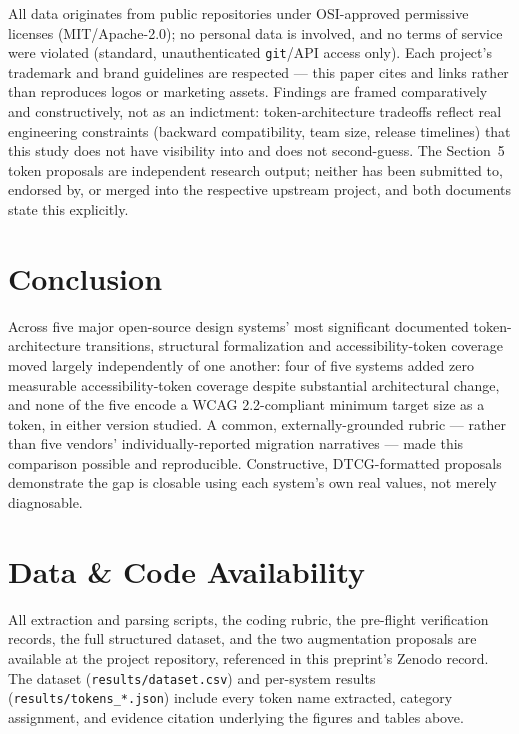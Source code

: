 \documentclass[11pt]{article}
\begin{document}
All data originates from public repositories under OSI-approved permissive licenses (MIT/Apache-2.0); no personal data is involved, and no terms of service were violated (standard, unauthenticated \texttt{git}/API access only). Each project's trademark and brand guidelines are respected --- this paper cites and links rather than reproduces logos or marketing assets. Findings are framed comparatively and constructively, not as an indictment: token-architecture tradeoffs reflect real engineering constraints (backward compatibility, team size, release timelines) that this study does not have visibility into and does not second-guess. The Section~5 token proposals are independent research output; neither has been submitted to, endorsed by, or merged into the respective upstream project, and both documents state this explicitly.

\section{Conclusion}

Across five major open-source design systems' most significant documented token-architecture transitions, structural formalization and accessibility-token coverage moved largely independently of one another: four of five systems added zero measurable accessibility-token coverage despite substantial architectural change, and none of the five encode a WCAG 2.2-compliant minimum target size as a token, in either version studied. A common, externally-grounded rubric --- rather than five vendors' individually-reported migration narratives --- made this comparison possible and reproducible. Constructive, DTCG-formatted proposals demonstrate the gap is closable using each system's own real values, not merely diagnosable.

\section*{Data \& Code Availability}

All extraction and parsing scripts, the coding rubric, the pre-flight verification records, the full structured dataset, and the two augmentation proposals are available at the project repository, referenced in this preprint's Zenodo record. The dataset (\texttt{results/dataset.csv}) and per-system results (\texttt{results/tokens\_*.json}) include every token name extracted, category assignment, and evidence citation underlying the figures and tables above.
\end{document}
